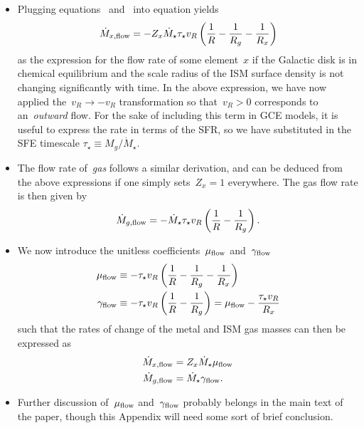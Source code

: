 \documentclass[main.tex]{subfiles}
\begin{document}
\begin{itemize}
	\item Plugging equations~
	and~ into equation
	 yields
	\begin{equation}
	\dot{M}_{x,\text{flow}} = -Z_x \dot{M}_\star \tau_\star v_R
	\left(\frac{1}{R} - \frac{1}{R_g} - \frac{1}{R_x}\right)
	\end{equation}
	as the expression for the flow rate of some element~$x$ if the Galactic
	disk is in chemical equilibrium and the scale radius of the ISM surface
	density is not changing significantly with time.
	In the above expression, we have now applied the~$v_R \rightarrow -v_R$
	transformation so that~$v_R > 0$ corresponds to an~\textit{outward} flow.
	For the sake of including this term in GCE models, it is useful to express
	the rate in terms of the SFR, so we have substituted in the SFE timescale
	$\tau_\star \equiv M_g / \dot{M}_\star$.

	\item The flow rate of~\textit{gas} follows a similar derivation, and can
	be deduced from the above expressions if one simply sets~$Z_x = 1$
	everywhere.
	The gas flow rate is then given by
	\begin{equation}
	\dot{M}_{g,\text{flow}} = -\dot{M}_\star \tau_\star v_R
	\left(\frac{1}{R} - \frac{1}{R_g}\right).
	\end{equation}

	\item We now introduce the unitless coefficients~$\mu_{\text{flow}}$
	and~$\gamma_{\text{flow}}$
	\begin{subequations}\begin{align}
	\mu_{\text{flow}} &\equiv -\tau_\star v_R
	\left(\frac{1}{R} - \frac{1}{R_g} - \frac{1}{R_x}\right)
	\\
	\gamma_{\text{flow}} &\equiv -\tau_\star v_R
	\left(\frac{1}{R} - \frac{1}{R_g}\right) =
	\mu_{\text{flow}} - \frac{\tau_\star v_R}{R_x}
	\end{align}\end{subequations}
	such that the rates of change of the metal and ISM gas masses can then be
	expressed as
	\begin{subequations}\begin{align}
	\dot{M}_{x,\text{flow}} &= Z_x \dot{M}_\star \mu_{\text{flow}}
	\\
	\dot{M}_{g,\text{flow}} &= \dot{M}_\star \gamma_{\text{flow}}.
	\end{align}\end{subequations}

	\item {\color{red} Further discussion of~$\mu_{\text{flow}}$ and~$\gamma_{\text{flow}}$
	probably belongs in the main text of the paper, though this Appendix will
	need some sort of brief conclusion.}

\end{itemize}
\end{document}
